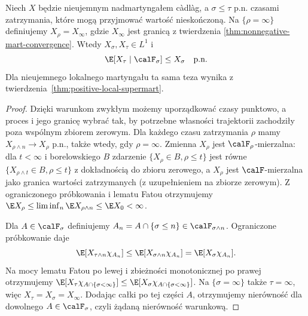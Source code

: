 \begin{twierdzenie}
\label{thm:ost-nonnegative-supermart}
Niech $X$ będzie nieujemnym nadmartyngałem c\`adl\`ag,
a $\sigma\le\tau$ p.n. czasami zatrzymania,
które mogą przyjmować wartość nieskończoną.
Na $\{\rho=\infty\}$ definiujemy $X_\rho=X_\infty$,
gdzie $X_\infty$ jest granicą z twierdzenia
\ref{thm:nonnegative-mart-convergence}.
Wtedy $X_\sigma,X_\tau\in L^1$ i
\[
\E[X_\tau\mid\calF_\sigma]\le X_\sigma
\quad\text{p.n.}
\]
Dla nieujemnego lokalnego martyngału ta sama teza
wynika z twierdzenia~\ref{thm:positive-local-supermart}.
\end{twierdzenie}
\begin{proof}
Dzięki warunkom zwykłym możemy uporządkować
czasy punktowo, a proces i jego granicę wybrać
tak, by potrzebne własności trajektorii zachodziły
poza wspólnym zbiorem zerowym.
Dla każdego czasu zatrzymania $\rho$ mamy
$X_{\rho\wedge n}\to X_\rho$ p.n., także wtedy,
gdy $\rho=\infty$. Zmienna $X_\rho$ jest
$\calF_\rho$-mierzalna: dla $t<\infty$
i borelowskiego $B$ zdarzenie
$\{X_\rho\in B,\rho\le t\}$
jest równe $\{X_{\rho\wedge t}\in B,\rho\le t\}$
z dokładnością do zbioru zerowego,
a $X_\rho$ jest $\calF$-mierzalna jako
granica wartości zatrzymanych (z uzupełnieniem
na zbiorze zerowym).
Z ograniczonego próbkowania i lematu Fatou
otrzymujemy
$\E X_\rho\le\liminf_n\E X_{\rho\wedge n}
\le\E X_0<\infty$.

Dla $A\in\calF_\sigma$ definiujemy
$A_n=A\cap\{\sigma\le n\}\in\calF_{\sigma\wedge n}$.
Ograniczone próbkowanie daje
\[
\E[X_{\tau\wedge n}\chi_{A_n}]
\le \E[X_{\sigma\wedge n}\chi_{A_n}]
=\E[X_\sigma\chi_{A_n}].
\]
Na mocy lematu Fatou po lewej i zbieżności
monotonicznej po prawej otrzymujemy
$\E[X_\tau\chi_{A\cap\{\sigma<\infty\}}]
\le\E[X_\sigma\chi_{A\cap\{\sigma<\infty\}}]$.
Na $\{\sigma=\infty\}$ także $\tau=\infty$,
więc $X_\tau=X_\sigma=X_\infty$.
Dodając całki po tej części $A$, otrzymujemy
nierówność dla dowolnego $A\in\calF_\sigma$,
czyli żądaną nierówność warunkową.
\end{proof}

